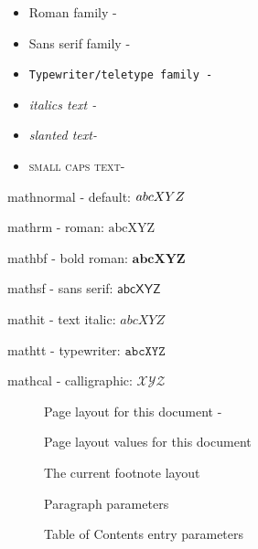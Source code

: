 \begin{itemize}
	\item \textrm{Roman family - \showfont }
	\item \textsf{Sans serif family - \showfont}
	\item \texttt{Typewriter/teletype family - \showfont}
	\item \textit{italics text - \showfont}
	\item \textsl{slanted text- \showfont}
	\item \textsc{small caps text- \showfont}
\end{itemize}




mathnormal -  default: $\mathnormal{abcXYZ}$

mathrm - roman: $\mathrm{abcXYZ}$

mathbf - bold roman: $\mathbf{abcXYZ}$

mathsf - sans serif: $\mathsf{abcXYZ}$

mathit - text italic: $\mathit{abcXYZ}$

mathtt -  typewriter: $\mathtt{abcXYZ}$

mathcal - calligraphic: $\mathcal{XYZ}$



\begin{figure}
	\caption{Page layout for this document -  \showfont} \label{fig:ptrs}
\end{figure}


\begin{figure}
	\caption{Page layout values for this document} \label{fig:ptrsval}

\end{figure}



\begin{figure}
	\caption{The current footnote layout}\label{fig:ftry}
\end{figure}


\begin{figure}
	\caption{Paragraph parameters}\label{fig:fpara}
\end{figure}


\begin{figure}
	\caption{Table of Contents entry parameters}\label{fig:tocp}
\end{figure}




